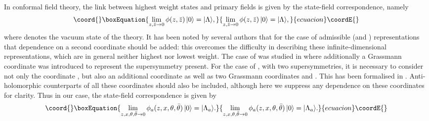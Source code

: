 \documentclass[a4paper,12pt]{article}
\def\thetabar    {\bar{\theta}}
\def\hslck       {\hat{sl}(2|1;{\mathbb C})_k}
\begin{document}
In conformal field theory, the link between highest weight states and
primary fields is given by the state-field correspondence, namely
\begin{equation}\coord{}\boxEquation{
\lim_{z, \bar{z} \rightarrow 0} \phi(z,
\bar{z})\,|0 \rangle = |\Lambda \rangle,
}{
\lim_{z, \bar{z} \rightarrow 0} \phi(z,
\bar{z})\,|0 \rangle = |\Lambda \rangle,
}{ecuacion}\coordE{}\end{equation}
where \myHighlight{$|0 \rangle$}\coordHE{} denotes the vacuum state of the theory.  It
has been noted by several authors \cite{AY, BF, FGP, FM, DLM, PRY,
And}  that for the case of 
admissible \coordHE{} (and \coordHE{} \cite{FGP1, FGP2, GPW})
representations that dependence on a second \coordHE{} coordinate should
be added: this overcomes the difficulty in describing these
infinite-dimensional representations, which are in general neither
highest nor lowest weight.  The case of \coordHE{} was
studied in \cite{ER} where additionally a Grassmann coordinate
\myHighlight{$\theta$}\coordHE{} was introduced to represent the supersymmetry present.  For
the case of \myHighlight{$\hslck$}\coordHE{}, with two supersymmetries, it is necessary to
consider not only the coordinate \coordHE{}, but also an additional \coordHE{}
coordinate \coordHE{} as well as two Grassmann coordinates \myHighlight{$\theta$}\coordHE{} and
\myHighlight{$\thetabar$}\coordHE{}.  This has been formalised in \cite{Ras}.  Anti-holomorphic 
counterparts of all these coordinates
should also be included, although here we suppress any dependence on
these coordinates for clarity.  Thus in our case, the state-field
correspondence is given by
\begin{equation}\coord{}\boxEquation{
\label{stfi}
\lim_{z,x,\theta,\thetabar \rightarrow
0} \phi_a (z,x,\theta,\thetabar)\,|0 \rangle =
|\Lambda_a \rangle.
}{
\lim_{z,x,\theta,\thetabar \rightarrow
0} \phi_a (z,x,\theta,\thetabar)\,|0 \rangle =
|\Lambda_a \rangle.
}{ecuacion}\coordE{}\end{equation}
\end{document}
